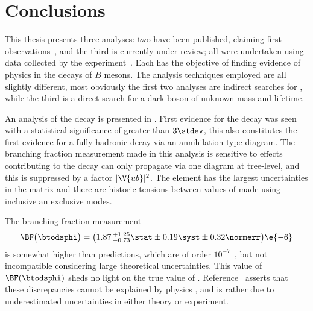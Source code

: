 \chapter{Conclusions}
\label{ch:conc}

This thesis presents three analyses: two have been published, claiming first
observations~\cite{LHCb-PAPER-2012-025,LHCb-PAPER-2014-030}, and the third is currently under
review; all were
undertaken using data collected by the \lhcb experiment~\cite{Alves:2008zz}.
Each has the objective of finding evidence of physics \bsm in the decays of $B$ mesons.
The analysis techniques employed are all slightly different, most obviously the first two analyses
are indirect searches for \np, while the third is a direct search for a dark boson of unknown mass
and lifetime.

An analysis of the decay \btodsphi is presented in .
First evidence for the decay was seen with a statistical significance of greater than $3\stdev$,
this also constitutes the first evidence for a fully hadronic decay via an annihilation-type
diagram.
The branching fraction measurement made in this analysis is sensitive to \np effects contributing
to the decay \btodsphi can only propagate via one diagram at tree-level, and this is suppressed by
a factor $|\V{ub}|^2$.
The element  has the largest uncertainties in the \ckm matrix and there are historic tensions
between values of  made using inclusive an exclusive modes.


The branching fraction measurement
\begin{equation*}
  \BF\big(\btodsphi\big) =
  \big(1.87\,^{+1.25}_{-0.73}\stat\pm0.19\syst\pm0.32\normerr\big)\e{-6}
\end{equation*}
is somewhat higher than \sm predictions, which are
of order $10^{-7}$~\cite{Zou:2009zza,Mohanta:2002wf,PhysRevD.76.057701,Lu:2001yz}, but
not incompatible considering large theoretical uncertainties.
This value of $\BF(\btodsphi)$ sheds no light on the true value of .
Reference~\cite{Crivellin:2014zpa} asserts that these
discrepancies cannot be explained by physics \bsm, and is rather due to underestimated
uncertainties in either theory or experiment.

